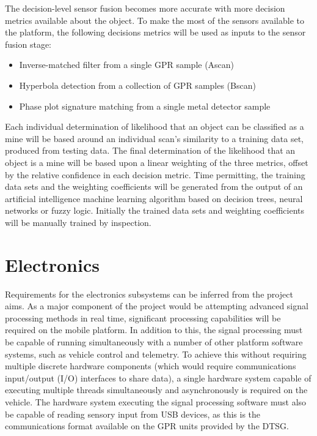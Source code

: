 \documentclass[main.tex]{subfiles}
\begin{document}
The decision-level sensor fusion becomes more accurate with more decision metrics available about the object. To make the most of the sensors available to the platform, the following decisions metrics will be used as inputs to the sensor fusion stage:
\begin{itemize}
\item Inverse-matched filter from a single GPR sample (Ascan)
\item Hyperbola detection from a collection of GPR samples (Bscan)
\item Phase plot signature matching from a single metal detector sample
\end{itemize}
Each individual determination of likelihood that an object can be classified as a mine will be based around an individual scan's similarity to a training data set, produced from testing data. The final determination of the likelihood that an object is a mine will be based upon a linear weighting of the three metrics, offset by the relative confidence in each decision metric. Time permitting, the training data sets and the weighting coefficients will be generated from the output of an artificial intelligence machine learning algorithm based on decision trees, neural networks or fuzzy logic. Initially the trained data sets and weighting coefficients will be manually trained by inspection.

\section{Electronics}
Requirements for the electronics subsystems can be inferred from the project aims. As a major component of the project would be attempting advanced signal processing methods in real time, significant processing capabilities will be required on the mobile platform. In addition to this, the signal processing must be capable of running simultaneously with a number of other platform software systems, such as vehicle control and telemetry. To achieve this without requiring multiple discrete hardware components (which would require communications input/output (I/O) interfaces to share data), a single hardware system capable of executing multiple threads simultaneously and asynchronously is required on the vehicle. The hardware system executing the signal processing software must also be capable of reading sensory input from USB devices, as this is the communications format available on the GPR units provided by the DTSG. 
% 
\end{document}

